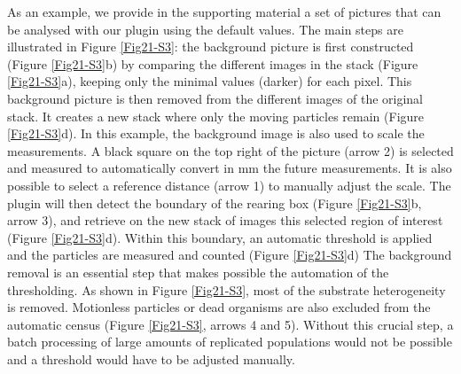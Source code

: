 As an example, we provide in the supporting material a set of pictures that can
be analysed with our plugin using the default values. The main steps are
illustrated in Figure \ref{Fig21-S3}: the background picture is first constructed (Figure
\ref{Fig21-S3}b) by comparing the different images in the stack (Figure
\ref{Fig21-S3}a), keeping only the minimal values (darker) for each pixel. This background picture is then
removed from the different images of the original stack. It creates a new stack
where only the moving particles remain (Figure \ref{Fig21-S3}d). In this example, the
background image is also used to scale the measurements. A black square on the
top right of the picture (arrow 2) is selected and measured to automatically
convert in mm the future measurements. It is also possible to select a reference
distance (arrow 1) to manually adjust the scale. The plugin will then detect the
boundary of the rearing box (Figure \ref{Fig21-S3}b, arrow 3), and retrieve on the new stack
of images this selected region of interest (Figure \ref{Fig21-S3}d). Within this boundary,
an automatic threshold is applied and the particles are measured and counted
(Figure \ref{Fig21-S3}d) The background removal is an essential step that makes possible the
automation of the thresholding. As shown in Figure \ref{Fig21-S3}, most of the substrate
heterogeneity is removed. Motionless particles or dead organisms are also
excluded from the automatic census (Figure \ref{Fig21-S3}, arrows 4 and 5). Without this
crucial step, a batch processing of large amounts of replicated populations
would not be possible and a threshold would have to be adjusted manually.

